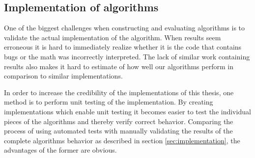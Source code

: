 \subsection{Implementation of algorithms}

One of the biggest challenges when constructing and evaluating algorithms is to
validate the actual implementation of the algorithm. When results seem 
erroneous it is hard to immediately realize whether it is the code that contains bugs or the 
math was incorrectly interpreted. The lack of similar work containing results
also makes it hard to estimate of how well our algorithms perform in comparison 
to similar implementations.

In order to increase the credibility of the implementations of this thesis, one method is
to perform unit testing of the implementation. By creating implementations
which enable unit testing it becomes easier to test the individual pieces of
the algorithms and thereby verify correct behavior. Comparing the process of
using automated tests with manually validating the results of the complete
algorithms behavior as described in section \ref{sec:implementation}, the
advantages of the former are obvious.
